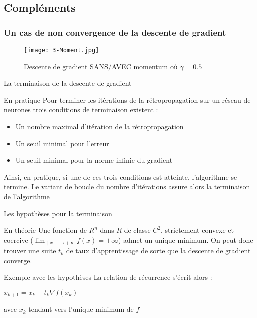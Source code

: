 \subsection{Compléments}

\begin{frame}
    \frametitle{Un cas de non convergence de la descente de gradient}
    \begin{figure}
        \centering
        \texttt{[image: 3-Moment.jpg]}
        \caption{Descente de gradient SANS/AVEC momentum où $\gamma = 0.5$}
    \end{figure}
\end{frame}

\begin{frame}{La terminaison de la descente de gradient}
    \begin{block}{En pratique}
        Pour terminer les itérations de la rétropropagation sur un réseau de neurones trois conditions de terminaison existent :
        \begin{itemize}
            \item Un nombre maximal d'itération de la rétropropagation
            \item Un seuil minimal pour l'erreur
            \item Un seuil minimal pour la norme infinie du gradient
        \end{itemize}
        Ainsi, en pratique, si une de ces trois conditions est atteinte, l'algorithme se termine. Le variant de boucle du nombre d'itérations assure alors la terminaison de l'algorithme
    \end{block}
\end{frame}

\begin{frame}{Les hypothèses pour la terminaison}
    \begin{alertblock}{En théorie}
        Une fonction de $R^n$ dans $R$ de classe $C^2$, strictement convexe et coercive ($\lim_{\lVert x \rVert \to+\infty} f(x) = +\infty$) admet un unique minimum. On peut donc trouver une suite $t_k$ de taux d'apprentissage de sorte que la descente de gradient converge.
    \end{alertblock}
    \begin{exampleblock}{Exemple avec les hypothèses}
        La relation de récurrence s'écrit alors : \\
        \begin{center}
            \centering
                $x_{k+1} = x_k - t_k \nabla f(x_k)$
        \end{center}
        avec $x_k$ tendant vers l'unique minimum de $f$
    \end{exampleblock}
\end{frame}

